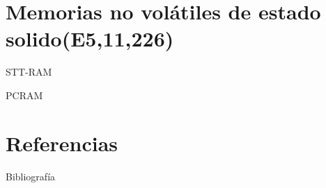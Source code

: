 \documentclass[presentation]{beamer}
\begin{document}
\section{Memorias no volátiles de estado solido(E5,11,226)}
\label{sec:orgbccf795}
\begin{frame}[label={sec:org8060d2a}]{STT-RAM}
\end{frame}
\begin{frame}[label={sec:org33ce9f3}]{PCRAM}
\end{frame}

\section{Referencias}
\label{sec:orgc7f85ac}
\begin{frame}[allowframebreaks]{Bibliografía}
\printbibliography
\end{frame}
\end{document}
